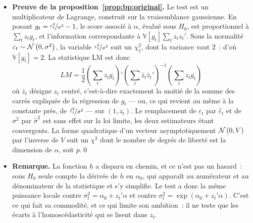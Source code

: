 \documentclass[10pt]{beamer}
\begin{document}
\begin{notes}

  \begin{itemize}

  \item \textbf{Preuve de la proposition~\ref{prop:bp:original}.} Le test est un
    multiplicateur de Lagrange, construit sur la vraisemblance gaussienne. En
    posant $g_t = \nicefrac{\varepsilon_t^2}{\sigma^2} - 1$, le score associé
    à $\alpha$, évalué sous $H_0$, est proportionnel à $\sum_t z_t g_t$, et
    l'information correspondante à $\mathbb V[g_t]\sum_t z_tz_t'$. Sous la
    normalité $\varepsilon_t\sim\mathcal N\left(0,\sigma^2\right)$, la variable
    $\nicefrac{\varepsilon_t^2}{\sigma^2}$ suit un $\chi^2_1$, dont la variance
    vaut $2$~: d'où $\mathbb V[g_t]=2$. La statistique LM est donc
    \[
      LM = \frac{1}{2}\left(\sum_t z_tg_t\right)'
      \left(\sum_t \bar z_t\bar z_t'\right)^{-1}\left(\sum_t z_tg_t\right)
    \]
    où $\bar z_t$ désigne $z_t$ centré, c'est-à-dire exactement la moitié de la
    somme des carrés expliquée de la régression de $g_t$ — ou, ce qui revient au
    même à la constante près, de $\nicefrac{\hat\varepsilon_t^2}{\hat\sigma^2}$
    — sur $(1,z_t)$. Le remplacement de $\varepsilon_t$ par $\hat\varepsilon_t$
    et de $\sigma^2$ par $\hat\sigma^2$ est sans effet sur la loi limite, les
    deux estimateurs étant convergents. La forme quadratique d'un vecteur
    asymptotiquement $\mathcal N\left(0,V\right)$ par l'inverse de $V$ suit un $\chi^2$ dont
    le nombre de degrés de liberté est la dimension de $\alpha$, soit $p$.\qed\newline

  \item \textbf{Remarque.} La fonction $h$ a disparu en chemin, et ce n'est pas
    un hasard~: sous $H_0$ seule compte la dérivée de $h$ en $\alpha_0$, qui
    apparaît au numérateur et au dénominateur de la statistique et s'y simplifie.
    Le test a donc la même puissance locale contre $\sigma_t^2 = \alpha_0 +
    z_t'\alpha$ et contre $\sigma_t^2 = \exp(\alpha_0 + z_t'\alpha)$. C'est ce
    qui fait sa commodité, et ce qui limite son ambition~: il ne teste que les
    écarts à l'homoscédasticité qui se lisent dans $z_t$.

  \end{itemize}

\end{notes}
\end{document}

